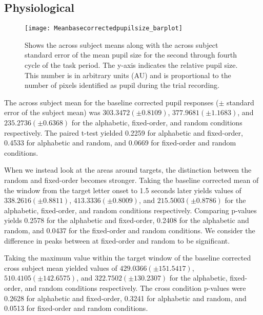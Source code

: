 \documentclass[10pt]{article}
\begin{document}
\subsection{Physiological}
\begin{figure}[t]
  \centering
  \texttt{[image: Meanbasecorrectedpupilsize\_barplot]}
  \caption{Shows the across subject means along with the across
  subject standard error of the mean pupil size for the second
  through fourth cycle of the task period. The y-axis indicates the
  relative pupil size.  This number is in arbitrary units (AU) and
  is proportional to the number of pixels identified as pupil during
  the trial recording.}
  \label{psBarplot}
\end{figure}

The across subject mean for the baseline corrected pupil responses
($\pm$ standard error of the subject mean) was $ 303.3472 (\pm 0.8109)$,
$377.9681 (\pm 1.1683)$, and $235.2736 (\pm 0.6368)$ for the alphabetic,
fixed-order, and random conditions respectively.
The paired t-test
yielded 0.2259 for alphabetic and fixed-order, 0.4533 for alphabetic
and random, and 0.0669 for fixed-order and random conditions.

When we instead look at the areas around targets, the distinction
between the random and fixed-order becomes stronger.  Taking
the baseline corrected mean of the window from the target letter
onset to 1.5 seconds later yields values of $338.2616 (\pm 0.8811)$,
$413.3336 (\pm 0.8009)$, and $215.5003 (\pm 0.8786)$ for the alphabetic,
fixed-order, and random conditions respectively.  Comparing p-values
yields 0.2578 for the alphabetic and fixed-order, 0.2408 for the
alphabetic and random, and 0.0437 for the fixed-order and random conditions.
We consider the difference in peaks between at fixed-order and
random to be significant.

Taking the maximum value within the target window of the baseline
corrected cross subject mean yielded  values of $429.0366 (\pm
151.5417)$, $510.4105 (\pm 142.6575)$, and $322.7502 (\pm 130.2307)$ for
the alphabetic, fixed-order, and random conditions respectively.
The cross condition p-values were 0.2628 for alphabetic and
fixed-order, 0.3241 for alphabetic and random, and 0.0513 for
fixed-order and random conditions.
\end{document}
